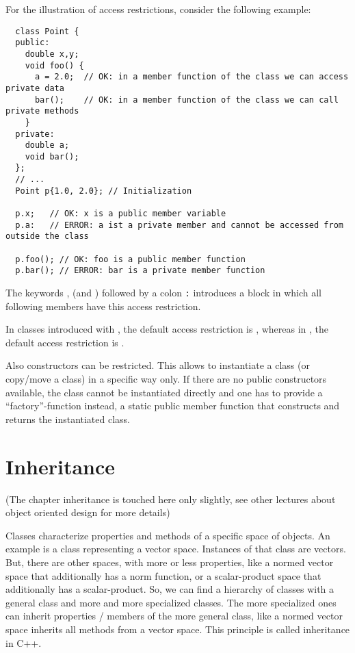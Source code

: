 \begin{example}
  For the illustration of access restrictions, consider the following example:
  \begin{verbatim}
  class Point {
  public:
    double x,y;
    void foo() {
      a = 2.0;  // OK: in a member function of the class we can access private data
      bar();    // OK: in a member function of the class we can call private methods
    }
  private:
    double a;
    void bar();
  };
  // ...
  Point p{1.0, 2.0}; // Initialization

  p.x;   // OK: x is a public member variable
  p.a:   // ERROR: a ist a private member and cannot be accessed from outside the class

  p.foo(); // OK: foo is a public member function
  p.bar(); // ERROR: bar is a private member function
  \end{verbatim}
\end{example}

The keywords ,  (and ) followed by a colon \texttt{:} introduces a block in which all following members
have this access restriction.

\begin{rem}
  In classes introduced with , the default access restriction is , whereas in , the default access restriction is
  .
\end{rem}

\begin{rem}
  Also constructors can be restricted. This allows to instantiate a class (or copy/move a class) in a specific way only. If there are no public
  constructors available, the class cannot be instantiated directly and one has to provide a ``factory''-function instead, \ie a static public
  member function that constructs and returns the instantiated class.
\end{rem}


\section{Inheritance\label{sec:inheritance}}
(The chapter inheritance is touched here only slightly, see other lectures about object oriented design for more details)

Classes characterize properties and methods of a specific space of objects. An example is a class representing a vector space. Instances of that
class are vectors. But, there are other spaces, with more or less properties, like a normed vector space that additionally has a norm function, or
a scalar-product space that additionally has a scalar-product. So, we can find a hierarchy of classes with a general class and more and more specialized
classes. The more specialized ones can inherit properties / members of the more general class, like a normed vector space inherits all methods from a
vector space. This principle is called inheritance in C++.


